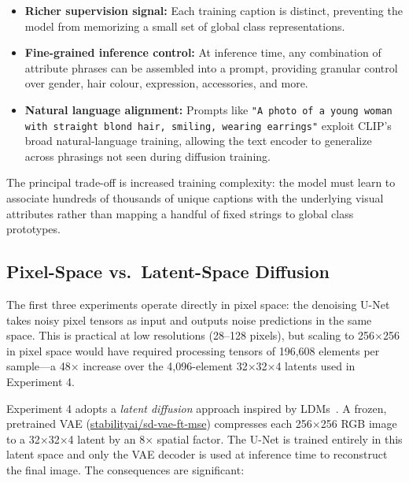\begin{itemize}
    \item \textbf{Richer supervision signal:} Each training caption is distinct, preventing the model from memorizing a small set of global class representations.
    \item \textbf{Fine-grained inference control:} At inference time, any combination of attribute phrases can be assembled into a prompt, providing granular control over gender, hair colour, expression, accessories, and more.
    \item \textbf{Natural language alignment:} Prompts like \texttt{"A photo of a young woman with straight blond hair, smiling, wearing earrings"} exploit CLIP's broad natural-language training, allowing the text encoder to generalize across phrasings not seen during diffusion training.
\end{itemize}

The principal trade-off is increased training complexity: the model must learn to associate hundreds of thousands of unique captions with the underlying visual attributes rather than mapping a handful of fixed strings to global class prototypes.

\subsection{Pixel-Space vs.\ Latent-Space Diffusion}

The first three experiments operate directly in pixel space: the denoising U-Net takes noisy pixel tensors as input and outputs noise predictions in the same space. This is practical at low resolutions (28--128 pixels), but scaling to 256$\times$256 in pixel space would have required processing tensors of 196,608 elements per sample---a 48$\times$ increase over the 4,096-element 32$\times$32$\times$4 latents used in Experiment 4.

Experiment 4 adopts a \emph{latent diffusion} approach inspired by LDMs~\cite{rombach2022high}. A frozen, pretrained VAE (\url{stabilityai/sd-vae-ft-mse}) compresses each 256$\times$256 RGB image to a 32$\times$32$\times$4 latent by an 8$\times$ spatial factor. The U-Net is trained entirely in this latent space and only the VAE decoder is used at inference time to reconstruct the final image. The consequences are significant:

